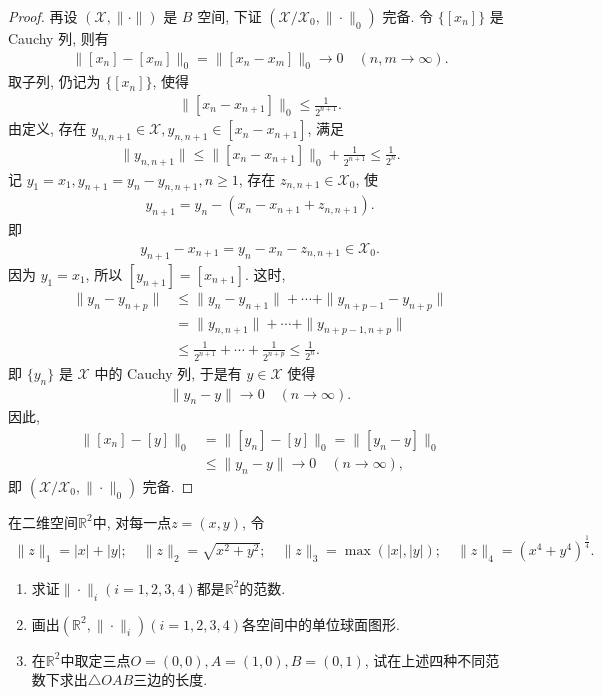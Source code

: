 \documentclass[../../main.tex]{subfiles}%
\begin{document}
\begin{proof}
再设 $(\mathscr{X},\|\cdot\|)$ 是 $B$ 空间, 下证 $(\mathscr{X}/\mathscr{X}_0,\|\cdot\|_0)$ 完备. 令 $\{[x_n]\}$ 是 Cauchy 列, 则有
\begin{align*}
\|[x_n] - [x_m]\|_0 = \|[x_n - x_m]\|_0 \to 0 \quad (n,m \to \infty).
\end{align*}
取子列, 仍记为 $\{[x_n]\}$, 使得
\begin{align*}
\|[x_n - x_{n+1}]\|_0 \leqslant \frac{1}{2^{n+1}}.
\end{align*}
由定义, 存在 $y_{n,n+1} \in \mathscr{X}, y_{n,n+1} \in [x_n - x_{n+1}]$, 满足
\begin{align*}
\|y_{n,n+1}\| \leqslant \|[x_n - x_{n+1}]\|_0 + \frac{1}{2^{n+1}} \leqslant \frac{1}{2^n}.
\end{align*}
记 $y_1 = x_1, y_{n+1} = y_n - y_{n,n+1}, n \geqslant 1$, 存在 $z_{n,n+1} \in \mathscr{X}_0$, 使
\begin{align*}
y_{n+1} = y_n - (x_n - x_{n+1} + z_{n,n+1}).
\end{align*}
即
\begin{align*}
y_{n+1} - x_{n+1} = y_n - x_n - z_{n,n+1} \in \mathscr{X}_0.
\end{align*}
因为 $y_1 = x_1$, 所以 $[y_{n+1}] = [x_{n+1}]$. 这时,
\begin{align*}
\|y_n - y_{n+p}\| &\leqslant \|y_n - y_{n+1}\| + \cdots + \|y_{n+p-1} - y_{n+p}\| \\
&= \|y_{n,n+1}\| + \cdots + \|y_{n+p-1,n+p}\| \\
&\leqslant \frac{1}{2^{n+1}} + \cdots + \frac{1}{2^{n+p}} \leqslant \frac{1}{2^n}.
\end{align*}
即 $\{y_n\}$ 是 $\mathscr{X}$ 中的 Cauchy 列, 于是有 $y \in \mathscr{X}$ 使得
\begin{align*}
\|y_n - y\| \to 0 \quad (n \to \infty).
\end{align*}
因此,
\begin{align*}
\|[x_n] - [y]\|_0 &= \|[y_n] - [y]\|_0 = \|[y_n - y]\|_0 \\
&\leqslant \|y_n - y\| \to 0 \quad (n \to \infty),
\end{align*}
即 $(\mathscr{X}/\mathscr{X}_0,\|\cdot\|_0)$ 完备.
\end{proof}

\begin{example}
在二维空间$\mathbb{R}^2$中, 对每一点$z = (x, y)$, 令
\begin{align*}
\|z\|_1 = |x| + |y|; \quad \|z\|_2 = \sqrt{x^2 + y^2}; \quad 
\|z\|_3 = \max(|x|, |y|); \quad \|z\|_4 = (x^4 + y^4)^{\frac{1}{4}}.
\end{align*}
\begin{enumerate}[(1)]
\item 求证$\|\cdot\|_i(i = 1, 2, 3, 4)$都是$\mathbb{R}^2$的范数.
\item 画出$(\mathbb{R}^2, \|\cdot\|_i)(i = 1, 2, 3, 4)$各空间中的单位球面图形.
\item 在$\mathbb{R}^2$中取定三点$O = (0, 0), A = (1, 0), B = (0, 1)$, 试在上述四种不同范数下求出$\triangle OAB$三边的长度.
\end{enumerate}
\end{example}
\end{document}

